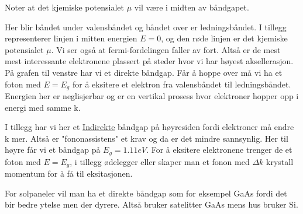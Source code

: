 \documentclass{article}
\begin{document}
Noter at det kjemiske potensialet $\mu$ vil være i midten av båndgapet.

\hskip 5pt

Her blir båndet under valensbåndet og båndet over er ledningsbåndet. I tillegg representerer linjen i mitten energien $E = 0$, og den røde linjen er det kjemiske potensialet $\mu$. Vi ser også at fermi-fordelingen faller av fort. Altså er de mest mest interessante elektronene plassert på steder hvor vi har høyest aksellerasjon. På grafen til venstre har vi et direkte båndgap. Får å hoppe over må vi ha et foton med $E = E_g$ for å eksitere et elektron fra valensbåndet til ledningsbåndet. Energien her er neglisjerbar og er en vertikal prosess hvor elektroner hopper opp i energi med samme k.

I tillegg har vi her et \underline{Indirekte} båndgap på høyresiden fordi elektroner må endre k mer. Altså er "fononassistens" et krav og da er det mindre sannsynlig. Her til høyre får vi et båndgap på $E_g = 1.11 eV$. For å eksitere elektronene trenger de et foton med $E = E_g$, i tillegg ødelegger eller skaper man et fonon med $\Delta k$ krystall momentum for å få til eksitasjonen.


For solpaneler vil man ha et direkte båndgap som for eksempel GaAs fordi det bir bedre ytelse men der dyrere. Altså bruker satelitter GaAs mens hus bruker Si.
\end{document}
